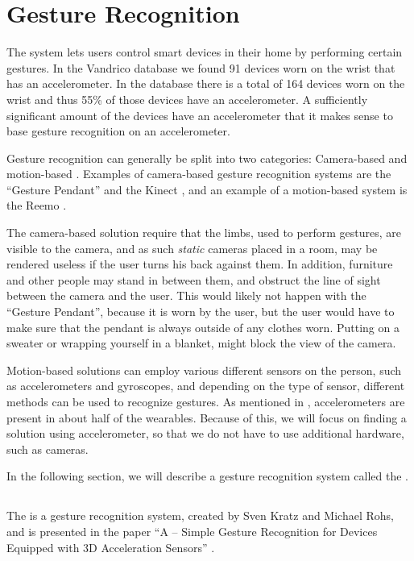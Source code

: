 \section{Gesture Recognition}\label{sec:gesturerecognition}
The system lets users control smart devices in their home by performing certain gestures.
In the Vandrico database we found 91 devices worn on the wrist that has an accelerometer. In the database there is a total of 164 devices worn on the wrist and thus 55\% of those devices have an accelerometer. A sufficiently significant amount of the devices have an accelerometer that it makes sense to base gesture recognition on an accelerometer.

Gesture recognition can generally be split into two categories: 
Camera-based and motion-based \cite{Kela2006}. 
Examples of camera-based gesture recognition systems are the ``Gesture Pendant'' \cite{starner2000gesture} and the Kinect \cite{kinect}, 
and an example of a motion-based system is the Reemo \cite{Reemo}.

The camera-based solution require that the limbs, 
used to perform gestures, 
are visible to the camera, 
and as such \emph{static} cameras placed in a room, 
may be rendered useless if the user turns his back against them. 
In addition, furniture and other people may stand in between them, 
and obstruct the line of sight between the camera and the user.
This would likely not happen with the ``Gesture Pendant'',
because it is worn by the user, 
but the user would have to make sure that the pendant is always outside of any clothes worn.
Putting on a sweater or wrapping yourself in a blanket, 
might block the view of the camera.

Motion-based solutions can employ various different sensors on the person,
such as accelerometers and gyroscopes, 
and depending on the type of sensor, 
different methods can be used to recognize gestures.
As mentioned in , accelerometers are present in about half of the wearables. 
Because of this, we will focus on finding a solution using accelerometer, 
so that we do not have to use additional hardware, such as cameras. 

In the following section, we will describe a gesture recognition system called the \threedollar. 

\subsection{\threedollar}\label{sec:threedollar}
The \threedollar is a gesture recognition system, 
created by Sven Kratz and Michael Rohs, 
and is presented in the paper ``A \threedollar – Simple Gesture Recognition for Devices Equipped with 3D Acceleration Sensors'' \cite{threedollar}.

